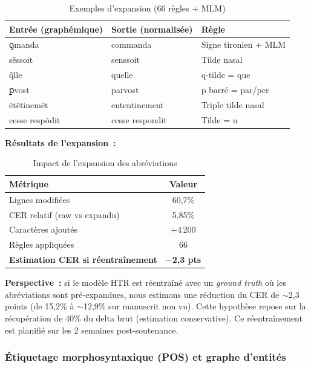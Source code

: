\documentclass[11pt,a4paper]{article}
\begin{document}
\begin{table}[H]
\centering
\caption{Exemples d'expansion (66 règles + MLM)}
\label{tab:abbrev}
\begin{tabular}{@{}lll@{}}
\toprule
\textbf{Entrée (graphémique)} & \textbf{Sortie (normalisée)} & \textbf{Règle} \\
\midrule
ꝯmanda & commanda & Signe tironien + MLM \\
sẽssoit & senssoit & Tilde nasal \\
q̃lle & quelle & q-tilde = que \\
ꝑvost & parvost & p barré = par/per \\
ẽtẽtinemẽt & ententinement & Triple tilde nasal \\
cesse respõdit & cesse respondit & Tilde = n \\
\bottomrule
\end{tabular}
\end{table}

\textbf{Résultats de l'expansion~:}

\begin{table}[H]
\centering
\caption{Impact de l'expansion des abréviations}
\label{tab:expansion_results}
\begin{tabular}{@{}lc@{}}
\toprule
\textbf{Métrique} & \textbf{Valeur} \\
\midrule
Lignes modifiées & 60,7\% \\
CER relatif (raw vs expandu) & 5,85\% \\
Caractères ajoutés & $+$4\,200 \\
Règles appliquées & 66 \\
\midrule
\textbf{Estimation CER si réentraînement} & \textbf{$-$2,3 pts} \\
\bottomrule
\end{tabular}
\end{table}

\noindent\textbf{Perspective~:} si le modèle HTR est réentraîné avec un \textit{ground truth} où les abréviations sont pré-expandues, nous estimons une réduction du CER de $\sim$2,3 points (de 15,2\% à $\sim$12,9\% sur manuscrit non vu). Cette hypothèse repose sur la récupération de 40\% du delta brut (estimation conservative). Ce réentraînement est planifié sur les 2 semaines post-soutenance.

\subsubsection{Étiquetage morphosyntaxique (POS) et graphe d'entités}
\end{document}
